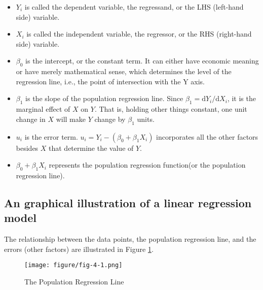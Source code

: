 \documentclass[a4paper,11pt]{article}
\begin{document}
\begin{itemize}
\item \(Y_i\) is called the dependent variable, the regressand, or the LHS
(left-hand side) variable.
\item \(X_i\) is called the independent variable, the regressor, or the RHS
(right-hand side) variable.
\item \(\beta_{0}\) is the intercept, or the constant term. It can either have
economic meaning or have merely mathematical sense, which determines
the level of the regression line, i.e., the point of intersection
with the Y axis.
\item \(\beta_{1}\) is the slope of the population regression line. Since
\(\beta_1 = \mathrm{d}Y_i/ \mathrm{d}X_i\), it is the marginal effect
of \(X\) on \(Y\). That is, holding other things constant, one unit
change in \(X\) will make \(Y\) change by \(\beta_1\) units.
\item \(u_i\) is the error term. \(u_i = Y_i - (\beta_0 + \beta_1 X_i)\)
incorporates all the other factors besides \(X\) that determine the
value of \(Y\).
\item \(\beta_{0} + \beta_{1}X_{i}\) represents the population regression
function(or the population regression line).
\end{itemize}


\subsection{An graphical illustration of a linear regression model}
\label{sec:org2472aaa}

The relationship between the data points, the population regression
line, and the errors (other factors) are illustrated in Figure \ref{fig:org355bbd5}.

\begin{figure}[htbp]
\centering
\texttt{[image: figure/fig-4-1.png]}
\caption{\label{fig:org355bbd5}
The Population Regression Line}
\end{figure}
\end{document}
